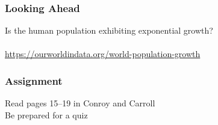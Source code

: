 \documentclass[color=usenames,dvipsnames]{beamer}\usepackage[]{graphicx}\usepackage[]{xcolor}
\begin{document}
\begin{frame}
  \frametitle{Looking Ahead}
  \centering
  Is the human population exhibiting exponential growth? \\
  \vfill
   \\
  \vfill
  \small
  \url{
    https://ourworldindata.org/world-population-growth
  } \\
\end{frame}


%  




\begin{frame}
  \frametitle{Assignment}
  \Large
  Read pages 15--19 in Conroy and Carroll \\
  \vspace{1cm}
  Be prepared for a quiz \\
\end{frame}
\end{document}
